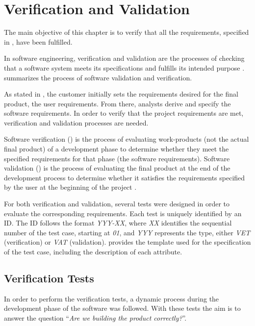 \chapter{Verification and Validation}\label{chap:validation}
The main objective of this chapter is to verify that all the requirements, specified in , have been fulfilled.

In software engineering, verification and validation are the processes of checking that a software system meets its specifications and fulfills its intended purpose \parencite{IEEE1012-2012}.  summarizes the process of software validation and verification.


As stated in , the customer initially sets the requirements desired for the final product, the user requirements. From there, analysts derive and specify the software requirements. In order to verify that the project requirements are met, verification and validation processes are needed.

Software verification () is the process of evaluating work-products (not the actual final product) of a development phase to determine whether they meet the specified requirements for that phase (the software requirements). Software validation () is the process of evaluating the final product at the end of the development process to determine whether it satisfies the requirements specified by the user at the beginning of the project \parencite{IEEE1012-2012}.

For both verification and validation, several tests were designed in order to evaluate the corresponding requirements. Each test is uniquely identified by an ID. The ID follows the format \textit{YYY-XX}, where \textit{XX} identifies the sequential number of the test case, starting at \textit{01}, and \textit{YYY} represents the type, either \textit{VET} (verification) or \textit{VAT} (validation).  provides the template used for the specification of the test case, including the description of each attribute.





\section{Verification Tests}\label{sec:verification}
In order to perform the verification tests, a dynamic process during the development phase of the software was followed. With these tests the aim is to answer the question ``\textit{Are we building the product correctly?}''.

